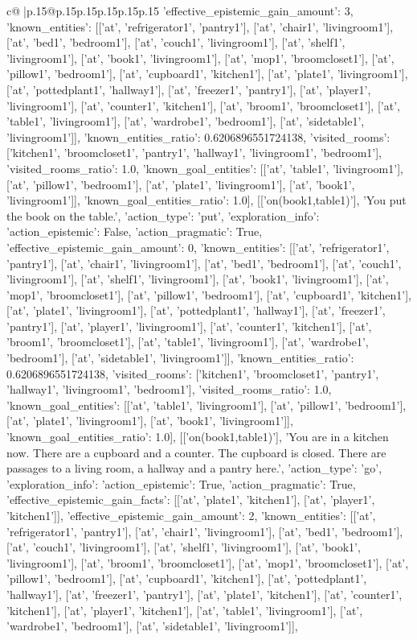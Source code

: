 \documentclass{article}
\begin{document}
{\begin{supertabular}{c@{$\;$}|p{.15\linewidth}@{}p{.15\linewidth}p{.15\linewidth}p{.15\linewidth}p{.15\linewidth}p{.15\linewidth}}
{{{'effective_epistemic_gain_amount': 3, 'known_entities': [['at', 'refrigerator1', 'pantry1'], ['at', 'chair1', 'livingroom1'], ['at', 'bed1', 'bedroom1'], ['at', 'couch1', 'livingroom1'], ['at', 'shelf1', 'livingroom1'], ['at', 'book1', 'livingroom1'], ['at', 'mop1', 'broomcloset1'], ['at', 'pillow1', 'bedroom1'], ['at', 'cupboard1', 'kitchen1'], ['at', 'plate1', 'livingroom1'], ['at', 'pottedplant1', 'hallway1'], ['at', 'freezer1', 'pantry1'], ['at', 'player1', 'livingroom1'], ['at', 'counter1', 'kitchen1'], ['at', 'broom1', 'broomcloset1'], ['at', 'table1', 'livingroom1'], ['at', 'wardrobe1', 'bedroom1'], ['at', 'sidetable1', 'livingroom1']], 'known_entities_ratio': 0.6206896551724138, 'visited_rooms': ['kitchen1', 'broomcloset1', 'pantry1', 'hallway1', 'livingroom1', 'bedroom1'], 'visited_rooms_ratio': 1.0, 'known_goal_entities': [['at', 'table1', 'livingroom1'], ['at', 'pillow1', 'bedroom1'], ['at', 'plate1', 'livingroom1'], ['at', 'book1', 'livingroom1']], 'known_goal_entities_ratio': 1.0}}], [['on(book1,table1)'], 'You put the book on the table.', {'action_type': 'put', 'exploration_info': {'action_epistemic': False, 'action_pragmatic': True, 'effective_epistemic_gain_amount': 0, 'known_entities': [['at', 'refrigerator1', 'pantry1'], ['at', 'chair1', 'livingroom1'], ['at', 'bed1', 'bedroom1'], ['at', 'couch1', 'livingroom1'], ['at', 'shelf1', 'livingroom1'], ['at', 'book1', 'livingroom1'], ['at', 'mop1', 'broomcloset1'], ['at', 'pillow1', 'bedroom1'], ['at', 'cupboard1', 'kitchen1'], ['at', 'plate1', 'livingroom1'], ['at', 'pottedplant1', 'hallway1'], ['at', 'freezer1', 'pantry1'], ['at', 'player1', 'livingroom1'], ['at', 'counter1', 'kitchen1'], ['at', 'broom1', 'broomcloset1'], ['at', 'table1', 'livingroom1'], ['at', 'wardrobe1', 'bedroom1'], ['at', 'sidetable1', 'livingroom1']], 'known_entities_ratio': 0.6206896551724138, 'visited_rooms': ['kitchen1', 'broomcloset1', 'pantry1', 'hallway1', 'livingroom1', 'bedroom1'], 'visited_rooms_ratio': 1.0, 'known_goal_entities': [['at', 'table1', 'livingroom1'], ['at', 'pillow1', 'bedroom1'], ['at', 'plate1', 'livingroom1'], ['at', 'book1', 'livingroom1']], 'known_goal_entities_ratio': 1.0}}], [['on(book1,table1)'], 'You are in a kitchen now. There are a cupboard and a counter. The cupboard is closed. There are passages to a living room, a hallway and a pantry here.', {'action_type': 'go', 'exploration_info': {'action_epistemic': True, 'action_pragmatic': True, 'effective_epistemic_gain_facts': [['at', 'plate1', 'kitchen1'], ['at', 'player1', 'kitchen1']], 'effective_epistemic_gain_amount': 2, 'known_entities': [['at', 'refrigerator1', 'pantry1'], ['at', 'chair1', 'livingroom1'], ['at', 'bed1', 'bedroom1'], ['at', 'couch1', 'livingroom1'], ['at', 'shelf1', 'livingroom1'], ['at', 'book1', 'livingroom1'], ['at', 'broom1', 'broomcloset1'], ['at', 'mop1', 'broomcloset1'], ['at', 'pillow1', 'bedroom1'], ['at', 'cupboard1', 'kitchen1'], ['at', 'pottedplant1', 'hallway1'], ['at', 'freezer1', 'pantry1'], ['at', 'plate1', 'kitchen1'], ['at', 'counter1', 'kitchen1'], ['at', 'player1', 'kitchen1'], ['at', 'table1', 'livingroom1'], ['at', 'wardrobe1', 'bedroom1'], ['at', 'sidetable1', 'livingroom1']], }}}
\end{supertabular}}
\end{document}
